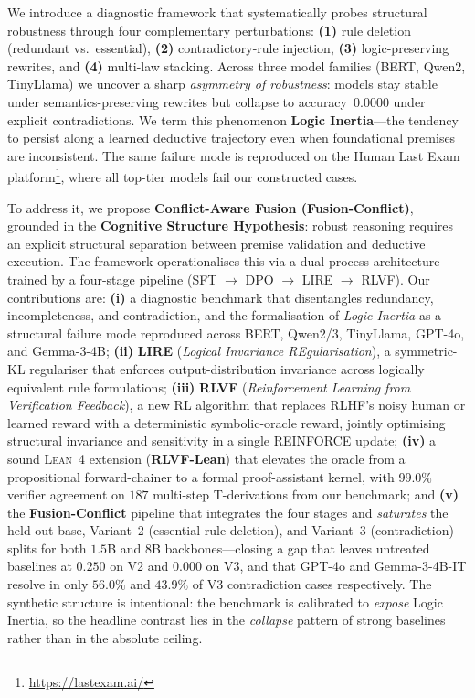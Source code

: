 \documentclass{article} %
\begin{document}
We introduce a diagnostic framework that systematically probes structural robustness through four complementary perturbations: \textbf{(1)} rule deletion (redundant vs.\ essential), \textbf{(2)} contradictory-rule injection, \textbf{(3)} logic-preserving rewrites, and \textbf{(4)} multi-law stacking. Across three model families (BERT, Qwen2, TinyLlama) we uncover a sharp \emph{asymmetry of robustness}: models stay stable under semantics-preserving rewrites but collapse to accuracy~$0.0000$ under explicit contradictions. We term this phenomenon \textbf{Logic Inertia}---the tendency to persist along a learned deductive trajectory even when foundational premises are inconsistent. The same failure mode is reproduced on the Human Last Exam platform\footnote{\url{https://lastexam.ai/}}, where all top-tier models fail our constructed cases.

To address it, we propose \textbf{Conflict-Aware Fusion (Fusion-Conflict)}, grounded in the \textbf{Cognitive Structure Hypothesis}: robust reasoning requires an explicit structural separation between premise validation and deductive execution. The framework operationalises this via a dual-process architecture trained by a four-stage pipeline (SFT $\to$ DPO $\to$ LIRE $\to$ RLVF). Our contributions are: \textbf{(i)} a diagnostic benchmark that disentangles redundancy, incompleteness, and contradiction, and the formalisation of \emph{Logic Inertia} as a structural failure mode reproduced across BERT, Qwen2/3, TinyLlama, GPT-4o, and Gemma-3-4B; \textbf{(ii)} \textbf{LIRE} (\emph{Logical Invariance REgularisation}), a symmetric-KL regulariser that enforces output-distribution invariance across logically equivalent rule formulations; \textbf{(iii)} \textbf{RLVF} (\emph{Reinforcement Learning from Verification Feedback}), a new RL algorithm that replaces RLHF's noisy human or learned reward with a deterministic symbolic-oracle reward, jointly optimising structural invariance and sensitivity in a single REINFORCE update; \textbf{(iv)} a sound \textsc{Lean~4} extension (\textbf{RLVF-Lean}) that elevates the oracle from a propositional forward-chainer to a formal proof-assistant kernel, with $99.0\%$ verifier agreement on $187$ multi-step T-derivations from our benchmark; and \textbf{(v)} the \textbf{Fusion-Conflict} pipeline that integrates the four stages and \emph{saturates} the held-out base, Variant~2 (essential-rule deletion), and Variant~3 (contradiction) splits for both $1.5$B and $8$B backbones---closing a gap that leaves untreated baselines at $0.250$ on V2 and $0.000$ on V3, and that GPT-4o and Gemma-3-4B-IT resolve in only $56.0\%$ and $43.9\%$ of V3 contradiction cases respectively. The synthetic structure is intentional: the benchmark is calibrated to \emph{expose} Logic Inertia, so the headline contrast lies in the \emph{collapse} pattern of strong baselines rather than in the absolute ceiling.
\end{document}
